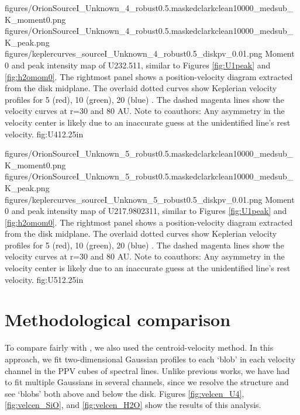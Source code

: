 \documentclass[twocolumn]{aastex61}
\begin{document}
\FigureThree
{{figures/OrionSourceI_Unknown_4_robust0.5.maskedclarkclean10000_medsub_K_moment0}.png}
{{figures/OrionSourceI_Unknown_4_robust0.5.maskedclarkclean10000_medsub_K_peak}.png}
{{figures/keplercurves_sourceI_Unknown_4_robust0.5_diskpv_0.01}.png}
{Moment 0 and peak intensity map of U232.511, similar to Figures \ref{fig:U1peak} and \ref{fig:h2omom0}.
The rightmost panel shows a position-velocity diagram extracted from the disk midplane.
The overlaid dotted curves show Keplerian velocity profiles for 5 (red), 10 (green), 20 (blue) \msun.
The dashed magenta lines show the velocity curves at r=30 and 80 AU.
{\color{red} Note to coauthors: Any asymmetry in the velocity center is likely due to an inaccurate
guess at the unidentified line's rest velocity.}
}
{fig:U4}{1}{2.25in}

\FigureThree
{{figures/OrionSourceI_Unknown_5_robust0.5.maskedclarkclean10000_medsub_K_moment0}.png}
{{figures/OrionSourceI_Unknown_5_robust0.5.maskedclarkclean10000_medsub_K_peak}.png}
{{figures/keplercurves_sourceI_Unknown_5_robust0.5_diskpv_0.01}.png}
{Moment 0 and peak intensity map of U217.9802311, similar to Figures \ref{fig:U1peak} and \ref{fig:h2omom0}.
The rightmost panel shows a position-velocity diagram extracted from the disk midplane.
The overlaid dotted curves show Keplerian velocity profiles for 5 (red), 10 (green), 20 (blue) \msun.
The dashed magenta lines show the velocity curves at r=30 and 80 AU.
{\color{red} Note to coauthors: Any asymmetry in the velocity center is likely due to an inaccurate
guess at the unidentified line's rest velocity.}
}
{fig:U5}{1}{2.25in}

\section{Methodological comparison}
\label{appendix:centroids}
To compare fairly with \citet{Plambeck2016a}, we also used the
centroid-velocity method.  In this approach, we fit two-dimensional Gaussian
profiles to each `blob' in each velocity channel in the PPV cubes of spectral
lines.  Unlike previous works, we have had to fit multiple Gaussians in several
channels, since we resolve the structure and see `blobs' both above and below
the disk.
Figures \ref{fig:velcen_U4}, \ref{fig:velcen_SiO}, and \ref{fig:velcen_H2O}
show the results of this analysis.

\end{document}
